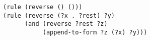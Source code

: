 \documentclass[a4paper,12pt]{article}
\begin{document}
\begin{lstlisting}
(rule (reverse () ()))
(rule (reverse (?x . ?rest) ?y)
      (and (reverse ?rest ?z)
           (append-to-form ?z (?x) ?y)))
\end{lstlisting}
\end{document}
